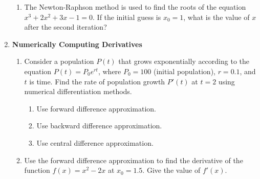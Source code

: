 \documentclass[11pt]{article}
\begin{document}
\begin{enumerate}
\begin{enumerate}
        \item The Newton-Raphson method is used to find the roots of the equation \( x^3 + 2x^2 + 3x - 1 = 0 \). If the initial guess is \( x_0 = 1 \), what is the value of \( x \) after the second iteration?
    \end{enumerate}

    \item \textbf{Numerically Computing Derivatives}
    \begin{enumerate}
        \item Consider a population \( P(t) \) that grows exponentially according to the equation \( P(t) = P_0 e^{rt} \), where \( P_0 = 100 \) (initial population), \( r = 0.1 \), and \( t \) is time. Find the rate of population growth \( P'(t) \) at \( t = 2 \) using numerical differentiation methods.
        \begin{enumerate}
            \item Use forward difference approximation.
            \item Use backward difference approximation.
            \item Use central difference approximation.
        \end{enumerate}

        \item Use the forward difference approximation to find the derivative of the function \( f(x) = x^2 - 2x \) at \( x_0 = 1.5 \). Give the value of \( f'(x) \).
    \end{enumerate}

\end{enumerate}
\end{document}
